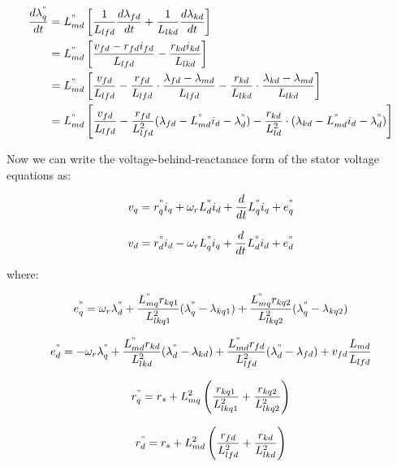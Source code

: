 \begin{align}
\begin{split}
\frac{d \lambda_q^"}{dt} &= L_{md}^" \left[ \frac{1}{L_{lfd}} \frac{d \lambda_{fd}}{dt} + \frac{1}{L_{lkd}} \frac{d \lambda_{kd}}{dt} \right] \\
&= L_{md}^" \left[ \frac{v_{fd} - r_{fd} i_{fd}}{L_{lfd}} - \frac{r_{kd} i_{kd}}{L_{lkd}} \right] \\
&= L_{md}^" \left[  \frac{v_{fd}}{L_{lfd}} - \frac{r_{fd}}{L_{lfd}} \cdot \frac{\lambda_{fd} - \lambda_{md}}{L_{lfd}} - \frac{r_{kd}}{L_{lkd}} \cdot \frac{\lambda_{kd} - \lambda_{md}}{L_{lkd}} \right] \\
&= L_{md}^" \left[  \frac{v_{fd}}{L_{lfd}} - \frac{r_{fd}}{L_{lfd}^2} ( \lambda_{fd} - L_{md}^" i_d - \lambda_d^") - \frac{r_{kd}}{L_{ld}^2} \cdot (\lambda_{kd}- L_{md}^" i_d - \lambda_d^"  ) \right]
\end{split}
\end{align}

Now we can write the voltage-behind-reactanace form of the stator voltage equations as:

\begin{equation}
v_q = r_q^" i_q + \omega_r L_d^" i_d + \frac{d}{dt} L_q^" i_q + e_q^"
\end{equation} 

\begin{equation}
v_d = r_d^" i_d - \omega_r L_q^" i_q + \frac{d}{dt} L_d^" i_d + e_d^"
\end{equation} 

where:

\begin{equation}
e_q^" = \omega_r \lambda_d^" + \frac{L_{mq}^" r_{kq1}}{ L_{lkq1}^2} (\lambda_q^" - \lambda_{kq1}) + \frac{L_{mq}^" r_{kq2}}{L_{lkq2}^2} (\lambda_q^" - \lambda_{kq2})
\end{equation}

\begin{equation}
e_d^" = - \omega_r \lambda_q^" + \frac{L_{md}^" r_{kd}}{ L_{lkd}^2} (\lambda_d^" - \lambda_{kd}) + \frac{L_{md}^" r_{fd}}{L_{lfd}^2} (\lambda_d^" - \lambda_{fd}) + v_{fd} \frac{L_{md}}{L_{lfd}}
\end{equation}

\begin{equation}
r_q^" = r_s + L_{mq}^2 \left( \frac{r_{kq1}}{L_{lkq1}^2} + \frac{r_{kq2}}{L_{lkq2}^2} \right)
\end{equation}

\begin{equation}
r_d^" = r_s + L_{md}^2 \left( \frac{r_{fd}}{L_{lfd}^2} + \frac{r_{kd}}{L_{lkd}^2} \right)
\end{equation}

